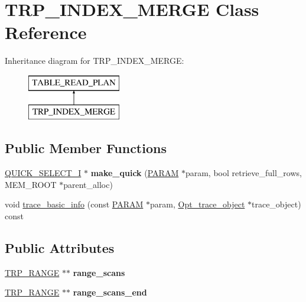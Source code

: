 \hypertarget{classTRP__INDEX__MERGE}{}\section{T\+R\+P\+\_\+\+I\+N\+D\+E\+X\+\_\+\+M\+E\+R\+GE Class Reference}
\label{classTRP__INDEX__MERGE}
Inheritance diagram for T\+R\+P\+\_\+\+I\+N\+D\+E\+X\+\_\+\+M\+E\+R\+GE\+:\begin{figure}[H]
\begin{center}
\leavevmode
\includegraphics[height=2.000000cm]{classTRP__INDEX__MERGE}
\end{center}
\end{figure}
\subsection*{Public Member Functions}
\begin{DoxyCompactItemize}
\item 
\mbox{\label{classTRP__INDEX__MERGE_a4194f0c40ab97ab28570ae31c3152896}} 
\mbox{\hyperlink{classQUICK__SELECT__I}{Q\+U\+I\+C\+K\+\_\+\+S\+E\+L\+E\+C\+T\+\_\+I}} $\ast$ {\bfseries make\+\_\+quick} (\mbox{\hyperlink{classPARAM}{P\+A\+R\+AM}} $\ast$param, bool retrieve\+\_\+full\+\_\+rows, M\+E\+M\+\_\+\+R\+O\+OT $\ast$parent\+\_\+alloc)
\item 
void \mbox{\hyperlink{classTRP__INDEX__MERGE_a2d384b4469b8be6dc5c246f7d5ad4307}{trace\+\_\+basic\+\_\+info}} (const \mbox{\hyperlink{classPARAM}{P\+A\+R\+AM}} $\ast$param, \mbox{\hyperlink{classOpt__trace__object}{Opt\+\_\+trace\+\_\+object}} $\ast$trace\+\_\+object) const
\end{DoxyCompactItemize}
\subsection*{Public Attributes}
\begin{DoxyCompactItemize}
\item 
\mbox{\label{classTRP__INDEX__MERGE_a7e59bbccfa9dd3eaeca51b2510d555cc}} 
\mbox{\hyperlink{classTRP__RANGE}{T\+R\+P\+\_\+\+R\+A\+N\+GE}} $\ast$$\ast$ {\bfseries range\+\_\+scans}
\item 
\mbox{\label{classTRP__INDEX__MERGE_a58aa2101f825bae9dfdb3ac2ac989510}} 
\mbox{\hyperlink{classTRP__RANGE}{T\+R\+P\+\_\+\+R\+A\+N\+GE}} $\ast$$\ast$ {\bfseries range\+\_\+scans\+\_\+end}
\end{DoxyCompactItemize}
